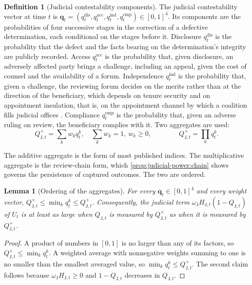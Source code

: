 \documentclass[11pt,letterpaper]{article}
\newtheorem{lemma}[theorem]{Lemma}
\theoremstyle{definition}
\newtheorem{definition}[theorem]{Definition}
\theoremstyle{remark}
\newcommand{\pJ}{\mathsf{J}}
\newcommand{\Qadd}{Q^{+}_{\pJ,t}}
\newcommand{\Qchain}{Q^{\times}_{\pJ,t}}
\begin{document}
\begin{definition}[Judicial contestability components]
\label{def:judicial-power:qj}
The judicial contestability vector at time $t$ is $\mathbf{q}_t=(q^{\mathrm{dis}}_t,q^{\mathrm{acc}}_t,q^{\mathrm{ind}}_t,q^{\mathrm{cmp}}_t)\in[0,1]^4$. Its components are the probabilities of four successive stages in the correction of a defective determination, each conditional on the stages before it. Disclosure $q^{\mathrm{dis}}_t$ is the probability that the defect and the facts bearing on the determination's integrity are publicly recorded. Access $q^{\mathrm{acc}}_t$ is the probability that, given disclosure, an adversely affected party brings a challenge, including an appeal, given the cost of counsel and the availability of a forum. Independence $q^{\mathrm{ind}}_t$ is the probability that, given a challenge, the reviewing forum decides on the merits rather than at the direction of the beneficiary, which depends on tenure security and on appointment insulation, that is, on the appointment channel by which a coalition fills judicial offices \citep{long2026political}. Compliance $q^{\mathrm{cmp}}_t$ is the probability that, given an adverse ruling on review, the beneficiary complies with it. Two aggregates are used:
\[
\Qadd=\sum_{k} w_k q^{k}_t,\quad \textstyle\sum_k w_k=1,\ w_k\ge 0, \qquad\qquad \Qchain=\prod_{k} q^{k}_t.
\]
\end{definition}

The additive aggregate is the form of most published indices. The multiplicative aggregate is the review-chain form, which \cref{prop:judicial-power:chain} shows governs the persistence of captured outcomes. The two are ordered.

\begin{lemma}[Ordering of the aggregates]
\label{lem:judicial-power:ordering}
For every $\mathbf{q}_t\in[0,1]^4$ and every weight vector, $\Qchain\le\min_k q^k_t\le\Qadd$. Consequently, the judicial term $\omega_{\pJ}H_{\pJ,t}(1-Q_{\pJ,t})$ of $U_t$ is at least as large when $Q_{\pJ,t}$ is measured by $\Qchain$ as when it is measured by $\Qadd$.
\end{lemma}

\begin{proof}
A product of numbers in $[0,1]$ is no larger than any of its factors, so $\Qchain\le\min_k q^k_t$. A weighted average with nonnegative weights summing to one is no smaller than the smallest averaged value, so $\min_k q^k_t\le\Qadd$. The second claim follows because $\omega_{\pJ}H_{\pJ,t}\ge 0$ and $1-Q_{\pJ,t}$ decreases in $Q_{\pJ,t}$.
\end{proof}
\end{document}
